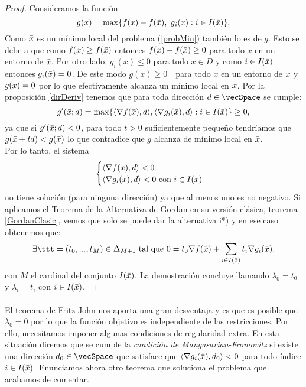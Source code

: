 		\begin{proof}
			Consideramos la función 
			\[
			g(x) = \max \{ f(x) - f(\bar{x}),\text{ } g_i(x) : i \in I(\bar{x})\}.
			\]
			Como $ \bar{x} $ es un mínimo local del problema (\ref{probMin}) también lo es de $ g $. Esto se debe a que como $ f(x) \geq f(\bar{x}) $ entonces $ f(x) - f(\bar{x}) \geq 0$ para todo $ x $ en un entorno de $ \bar{x} $. Por otro lado, $ g_i(x) \leq 0 $ para todo $ x \in D $ y como $ i \in I(\bar{x}) $ entonces $ g_i(\bar{x})=0 $. De este modo $ g(x) \geq 0 \text{ } $ para todo $ x $ en un entorno de $ \bar{x} $ y $ g(\bar{x}) = 0 $ por lo que efectivamente alcanza un mínimo local en $ \bar{x} $. Por la proposición \ref{dirDeriv} tenemos que para toda dirección $ d \in \vecSpace $ se cumple:
			\[
			g'(\bar{x};d) = \max \{ \langle \nabla f(\bar{x}), d\rangle , \langle \nabla g_i(\bar{x}),d \rangle : i \in I(\bar{x})\} \geq 0,
			\]
			ya que si $ g'(\bar{x};d) < 0 $, para todo $ t > 0 $ suficientemente pequeño tendríamos que $ g(\bar{x} + td) < g(\bar{x}) $ lo que contradice que $ g $ alcanza de mínimo local en $ \bar{x} $. \\
			
			Por lo tanto, el sistema 
			\begin{equation*}
			\begin{cases}
			\langle \nabla f(\bar{x}), d\rangle  < 0 \\
			\langle \nabla g_i(\bar{x}),d \rangle < 0\text{ con } i \in I(\bar{x})
			\end{cases}
			\end{equation*}
			no tiene solución (para ninguna dirección) ya que al menos uno es no negativo. Si aplicamos el Teorema de la Alternativa de Gordan en su versión clásica, teorema \ref{GordanClasic}, vemos que solo se puede dar la alternativa i*) y en ese caso obtenemos que:
			\[
			 \exists \ttt = (t_0, ..., t_{M})\in \Delta_{M+1}  \text{ tal que }0 = t_0 \nabla f(\barx) + \sum_{i \in I(\barx)}  t_i \nabla g_i (\barx),
			 \]
			con $ M $ el cardinal del conjunto $ I(\bar{x}) $. La demostración concluye llamando $ \lambda_0 = t_0 $ y $ \lambda_i = t_i $ con $ i \in I(\bar{x}) $.
		\end{proof}
	
		\paragraph{}El teorema de Fritz John nos aporta una gran desventaja y es que es posible que $ \lambda_0 = 0 $ por lo que la función objetivo es independiente de las restricciones. Por ello, necesitamos imponer algunas condiciones de regularidad extra. En esta situación diremos que se cumple la \textit{condición de Mangasarian-Fromovitz} si existe una dirección $ d_0 \in \vecSpace $ que satisface que $ \langle \nabla g_i(\bar{x}),d_0 \rangle < 0 $ para todo índice $ i \in I(\bar{x})$. Enunciamos ahora otro teorema que soluciona el problema que acabamos de comentar.
		
